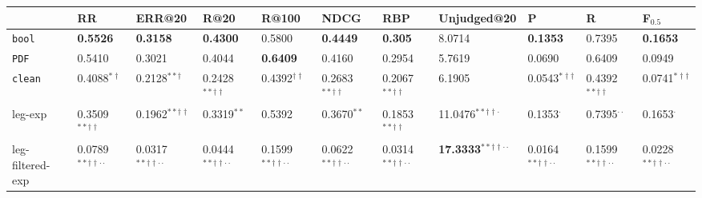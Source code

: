 \begin{tabular}{lllllllllll}
\toprule
{} &                                     RR &                                 ERR@20 &                                   R@20 &                                  R@100 &                                   NDCG &                                    RBP &                                      Unjudged@20 &                                      P &                                      R &                                F$_{0.5}$ \\
\midrule
\texttt{bool}    &                        \textbf{0.5526} &                        \textbf{0.3158} &                          \textbf{0.4300} &                                   0.5800 &                        \textbf{0.4449} &                         \textbf{0.305} &                                           8.0714 &                        \textbf{0.1353} &                                 0.7395 &                        \textbf{0.1653} \\
\texttt{PDF}     &                            0.5410$^{}$ &                            0.3021$^{}$ &                            0.4044$^{}$ &                   \textbf{0.6409}$^{}$ &                            0.4160$^{}$ &                            0.2954$^{}$ &                                      5.7619$^{}$ &                            0.0690$^{}$ &                            0.6409$^{}$ &                            0.0949$^{}$ \\
\texttt{clean} &                    0.4088$^{*\dagger}$ &                   0.2128$^{**\dagger}$ &            0.2428$^{**\dagger\dagger}$ &              0.4392$^{\dagger\dagger}$ &            0.2683$^{**\dagger\dagger}$ &            0.2067$^{**\dagger\dagger}$ &                                      6.1905$^{}$ &             0.0543$^{*\dagger\dagger}$ &            0.4392$^{**\dagger\dagger}$ &             0.0741$^{*\dagger\dagger}$ \\
leg-exp          &            0.3509$^{**\dagger\dagger}$ &            0.1962$^{**\dagger\dagger}$ &                          0.3319$^{**}$ &                            0.5392$^{}$ &                          0.3670$^{**}$ &            0.1853$^{**\dagger\dagger}$ &                11.0476$^{**\dagger\dagger\cdot}$ &                       0.1353$^{\cdot}$ &                  0.7395$^{\cdot\cdot}$ &                       0.1653$^{\cdot}$ \\
leg-filtered-exp &  0.0789$^{**\dagger\dagger\cdot\cdot}$ &  0.0317$^{**\dagger\dagger\cdot\cdot}$ &  0.0444$^{**\dagger\dagger\cdot\cdot}$ &  0.1599$^{**\dagger\dagger\cdot\cdot}$ &  0.0622$^{**\dagger\dagger\cdot\cdot}$ &  0.0314$^{**\dagger\dagger\cdot\cdot}$ &  \textbf{17.3333}$^{**\dagger\dagger\cdot\cdot}$ &  0.0164$^{**\dagger\dagger\cdot\cdot}$ &  0.1599$^{**\dagger\dagger\cdot\cdot}$ &  0.0228$^{**\dagger\dagger\cdot\cdot}$ \\

\end{tabular}
